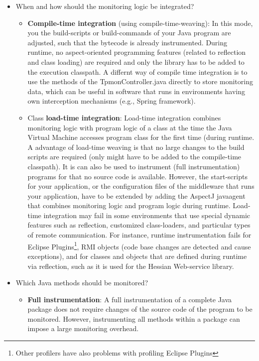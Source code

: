 \documentclass[a4paper,12pt]{scrartcl}
\begin{document}
\begin{itemize}
 \item When and how should the monitoring logic be integrated?
\begin{itemize}
 \item \textbf{Compile-time integration} (using compile-time-weaving): In this mode, you the build-scripts or build-commands of your Java program are adjusted, such that the bytecode is already instrumented. During runtime, no aspect-oriented programming features (related to reflection and class loading) are required and only the \tpmon{} library has to be added to the execution classpath. A differnt way of compile time integration is to use the methods of the TpmonController.java directly to store monitoring data, which can be useful in software that runs in environments having own interception mechanisms (e.g., Spring framework).
\item Class \textbf{load-time integration}: Load-time integration combines monitoring logic with program logic of a class at the time the Java Virtual Machine accesses program class for the first time (during runtime. A advantage of load-time weaving is that no large changes to the build scripts are required (only \tpmon{} might have to be added to the compile-time classpath). It is can also be used to instrument (full instrumentation) programs for that no source code is available. However, the start-scripts for your application, or the configuration files of the middleware that runs your application, have to be extended by adding the AspectJ javaagent that combines monitoring logic and program logic during runtime. Load-time integration may fail in some environments that use special dynamic features such as reflection, customized class-loaders, and particular types of remote communication. For instance, runtime instrumentation fails for Eclipse Plugins\footnote{Other profilers have also problems with profiling Eclipse Plugins}, RMI objects (code base changes are detected and cause exceptions), and for classes and objects that are defined during runtime via reflection, such as it is used for the Hessian Web-service library.
\end{itemize}
\item Which Java methods should be monitored?
\begin{itemize}
\item \textbf{Full instrumentation}: A full instrumentation of a complete Java package does not require changes of the source code of the program to be monitored. However, instrumenting all methods within a package can impose a large monitoring overhead.

\end{itemize}
\end{itemize}
\end{document}
